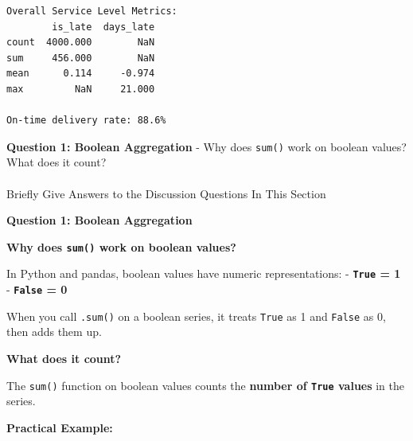 \documentclass[
  letterpaper,
  DIV=11,
  numbers=noendperiod]{scrartcl}
\makeatletter
\let\oldparagraph\paragraph
\renewcommand{\paragraph}{
    \@ifstar
      \xxxParagraphStar
      \xxxParagraphNoStar
  }
\newcommand{\xxxParagraphStar}[1]{\oldparagraph*{#1}\mbox{}}
\newcommand{\xxxParagraphNoStar}[1]{\oldparagraph{#1}\mbox{}}
\makeatother
\begin{document}
\begin{verbatim}
Overall Service Level Metrics:
        is_late  days_late
count  4000.000        NaN
sum     456.000        NaN
mean      0.114     -0.974
max         NaN     21.000

On-time delivery rate: 88.6%
\end{verbatim}

\begin{tcolorbox}[enhanced jigsaw, bottomtitle=1mm, opacitybacktitle=0.6, toptitle=1mm, colbacktitle=quarto-callout-important-color!10!white, breakable, coltitle=black, bottomrule=.15mm, left=2mm, colframe=quarto-callout-important-color-frame, colback=white, title=\textcolor{quarto-callout-important-color}{\faExclamation}\hspace{0.5em}{🤔 Discussion Questions: Aggregate Mental Model}, leftrule=.75mm, arc=.35mm, rightrule=.15mm, opacityback=0, toprule=.15mm, titlerule=0mm]

\textbf{Question 1: Boolean Aggregation} - Why does \texttt{sum()} work
on boolean values? What does it count?

\end{tcolorbox}

\paragraph{Briefly Give Answers to the Discussion Questions In This
Section}\label{briefly-give-answers-to-the-discussion-questions-in-this-section-4}

\textbf{Question 1: Boolean Aggregation}

\textbf{Why does \texttt{sum()} work on boolean values?}

In Python and pandas, boolean values have numeric representations: -
\textbf{\texttt{True} = 1} - \textbf{\texttt{False} = 0}

When you call \texttt{.sum()} on a boolean series, it treats
\texttt{True} as 1 and \texttt{False} as 0, then adds them up.

\textbf{What does it count?}

The \texttt{sum()} function on boolean values counts the \textbf{number
of \texttt{True} values} in the series.

\textbf{Practical Example:}
\end{document}
